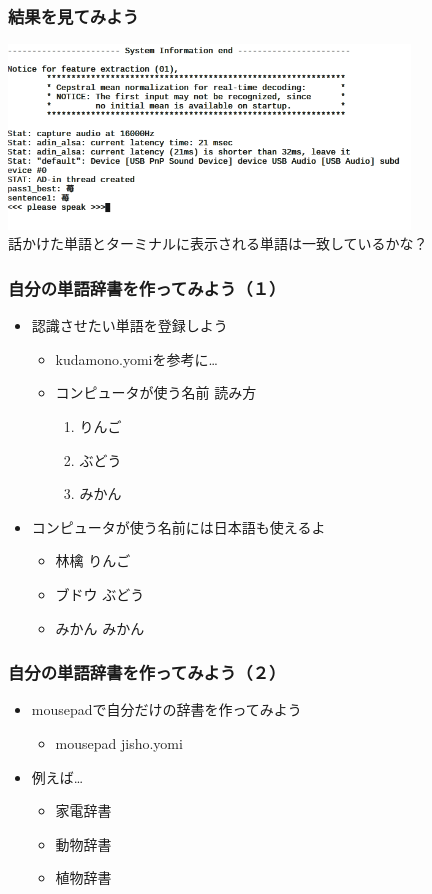 \documentclass[14pt]{beamer}
\begin{document}
\begin{frame}
\frametitle{結果を見てみよう} 
  \centering
  \includegraphics[width=0.8\textwidth]{julius_demo_strawberry.png} \\
  話かけた単語とターミナルに表示される単語は一致しているかな？
\end{frame}

\begin{frame}
  \frametitle{自分の単語辞書を作ってみよう（１）}
  \begin{itemize}
    \item 認識させたい単語を登録しよう
    \begin{itemize}
      \item kudamono.yomiを参考に…
      \item \<コンピュータが使う名前\> \<読み方\>
      \renewcommand{\theenumi}{\roman{enumi}}
      \begin{enumerate}
        \item りんご
        \item ぶどう
        \item みかん
      \end{enumerate}
    \end{itemize}
    \item \<コンピュータが使う名前\>には日本語も使えるよ
    \begin{itemize}
      \item 林檎 りんご
      \item ブドウ ぶどう
      \item みかん みかん
    \end{itemize}
  \end{itemize}
\end{frame}

\begin{frame}
  \frametitle{自分の単語辞書を作ってみよう（２）}
  \begin{itemize}
    \item mousepadで自分だけの辞書を作ってみよう
    \begin{itemize}
      \item mousepad jisho.yomi
    \end{itemize}
    \item 例えば…
    \begin{itemize}
      \item 家電辞書
      \item 動物辞書
      \item 植物辞書
    \end{itemize}
  \end{itemize}
\end{frame}
\end{document}
